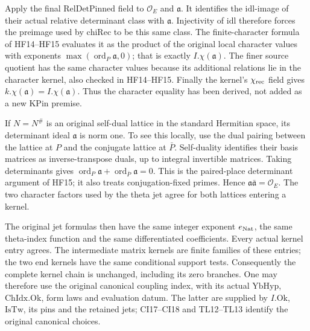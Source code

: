 Apply the final \(\mathrm{RelDetPinned}\) field to
\(\mathcal O_E\) and \(\mathfrak a\). It identifies the
\(\mathrm{idl}\)-image of their actual relative determinant
class with \(\mathfrak a\). Injectivity of \(\mathrm{idl}\)
therefore forces the preimage used by \(\mathrm{chiRec}\)
to be this same class. The finite-character formula of
HF14--HF15 evaluates it as the product of the original
local character values with exponents
\(\max(\operatorname{ord}_P\mathfrak a,0)\); that is
exactly \(I.\chi(\mathfrak a)\). The finer source quotient
has the same character values because its additional
relations lie in the character kernel, also checked in
HF14--HF15. Finally the kernel's \(\chi_{\rm rec}\)
field gives \(k.\chi(\mathfrak a)=I.\chi(\mathfrak a)\).
Thus the character equality has been derived, not added
as a new \(\mathrm{KPin}\) premise.

If \(N=N^\#\) is an original self-dual lattice in the
standard Hermitian space, its determinant ideal
\(\mathfrak a\) is norm one. To see this locally, use
the dual pairing between the lattice at \(P\) and the
conjugate lattice at \(\bar P\). Self-duality identifies
their basis matrices as inverse-transpose duals, up to
integral invertible matrices. Taking determinants gives
\(\operatorname{ord}_{P}\mathfrak a+
\operatorname{ord}_{\bar P}\mathfrak a=0\).
This is the paired-place determinant argument of HF15;
it also treats conjugation-fixed primes. Hence
\(\mathfrak a\bar{\mathfrak a}=\mathcal O_E\).
The two character factors used by the theta jet agree
for both lattices entering a kernel.

The original jet formulas then have the same integer exponent
\(e_{\rm Nat}\), the same theta-index function and the same
differentiated coefficients. Every actual kernel entry agrees.
The intermediate matrix kernels are finite families of these
entries; the two end kernels have the same conditional support
tests. Consequently the complete kernel chain is unchanged,
including its zero branches. One may therefore use the original
canonical coupling index, with its actual \(\mathrm{YbHyp}\),
\(\mathrm{ChIdx.Ok}\), form laws and evaluation datum. The latter
are supplied by \(I.\mathrm{Ok}\), \(\mathrm{IsTw}\), its pins and
the retained jets; CI17--CI18 and TL12--TL13 identify the original
canonical choices.

